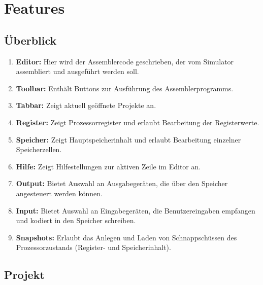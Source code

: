 
\section{Features}

\subsection*{Überblick}


\begin{enumerate}
\item \textbf{Editor:} Hier wird der Assemblercode geschrieben, der vom Simulator assembliert und ausgeführt werden soll.
\item \textbf{Toolbar:} Enthält Buttons zur Ausführung des Assemblerprogramms.
\item \textbf{Tabbar:} Zeigt aktuell geöffnete Projekte an.
\item \textbf{Register:} Zeigt Prozessorregister und erlaubt Bearbeitung der Registerwerte.
\item \textbf{Speicher:} Zeigt Hauptspeicherinhalt und erlaubt Bearbeitung einzelner Speicherzellen.
\item \textbf{Hilfe:} Zeigt Hilfestellungen zur aktiven Zeile im Editor an.
\item \textbf{Output:} Bietet Auswahl an Ausgabegeräten, die über den Speicher angesteuert werden können.
\item \textbf{Input:} Bietet Auswahl an Eingabegeräten, die Benutzereingaben empfangen und kodiert in den Speicher schreiben.
\item \textbf{Snapshots:} Erlaubt das Anlegen und Laden von Schnappschüssen des Prozessorzustands (Register- und Speicherinhalt).
\end{enumerate}


\subsection{Projekt}

